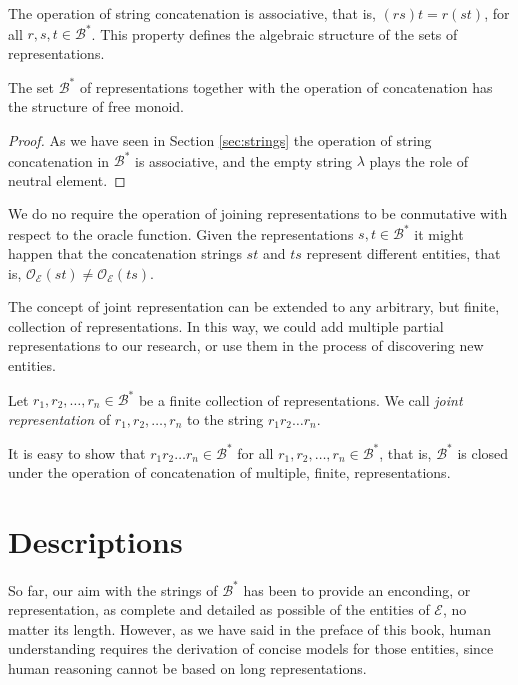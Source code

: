 The operation of string concatenation is associative, that is, $(rs)t = r(st)$, for all $r, s, t \in \mathcal{B}^\ast$. This property defines the algebraic structure of the sets of representations.

\begin{proposition}
The set $\mathcal{B}^\ast$ of representations together with the operation of concatenation has the structure of free monoid.
\end{proposition}
\begin{proof}
As we have seen in Section \ref{sec:strings} the operation of string concatenation in $\mathcal{B}^\ast$ is associative, and the empty string $\lambda$ plays the role of neutral element.
\end{proof}

We do no require the operation of joining representations to be conmutative with respect to the oracle function. Given the representations $s, t \in \mathcal{B}^\ast$ it might happen that the concatenation strings $st$ and $ts$ represent different entities, that is, $\mathcal{O}_\mathcal{E} \left( st \right) \neq \mathcal{O}_\mathcal{E} \left( ts \right)$.

The concept of joint representation can be extended to any arbitrary, but finite, collection of representations. In this way, we could add multiple partial representations to our research, or use them in the process of discovering new entities.

\begin{definition}
Let $r_1, r_2, \ldots, r_n \in \mathcal{B}^\ast$ be a finite collection of representations. We call \emph{joint representation} of $r_1, r_2, \ldots, r_n$ to the string $r_1 r_2 \ldots r_n$.
\end{definition}

It is easy to show that $r_1 r_2 \ldots r_n \in \mathcal{B}^\ast$ for all $r_1, r_2, \ldots, r_n \in \mathcal{B}^\ast$, that is, $\mathcal{B}^\ast$ is closed under the operation of concatenation of multiple, finite, representations.

%
%

\section{Descriptions}
\label{sec:descriptions_models}

So far, our aim with the strings of $\mathcal{B}^\ast$ has been to provide an enconding, or representation, as complete and detailed as possible of the entities of $\mathcal{E}$, no matter its length. However, as we have said in the preface of this book, human understanding requires the derivation of concise models for those entities, since human reasoning cannot be based on long representations.

